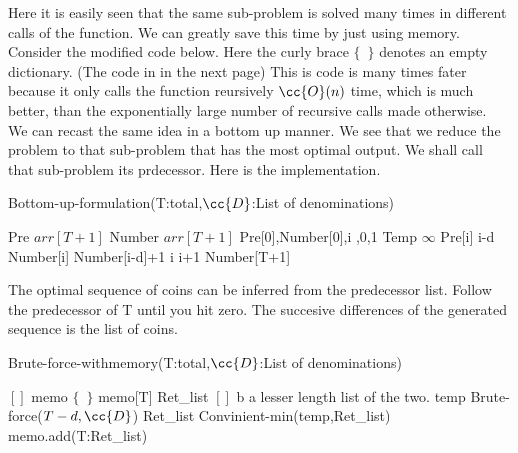 \documentclass{myclass}
\begin{document}
Here it is easily seen that the same sub-problem is solved many times in different 
calls of the function. We can greatly save this time by just using memory. Consider the modified code below.
Here the curly brace $\{\,\,\,\}$ denotes an empty dictionary. (The code in in the next page)
This is code is many times fater because it only calls the function reursively $\cc{O}(n)$ time,
which is much better, than the exponentially large number of recursive calls made otherwise.
\\
We can recast the same idea in a bottom up manner. We see that we reduce the problem to that sub-problem that has the most optimal output.
We shall call that sub-problem its prdecessor. Here is the implementation.
\begin{algorithm}
    \caption*{Bottom-up-formulation(T:total,$\cc{D}$:List of denominations)}
    \begin{algorithmic}[1]
        \State Pre \ass $arr[T+1]$   
        \State Number \ass $arr[T+1]$   
        \State Pre[0],Number[0],i ,0,1
            \State Temp \ass $\infty$
                    \State Pre[i] \ass i-d 
                    \State Number[i] \ass Number[i-d]+1
                \EndIf
            \EndFor
        \State i \ass i+1
        \EndWhile
        \State {} Number[T+1]
    \end{algorithmic}
\end{algorithm}

The optimal sequence of coins can be inferred from the predecessor list. Follow the predecessor of T until you hit zero. The
succesive differences of the generated sequence is the list of coins.

\newpage
\begin{algorithm}
    \caption*{Brute-force-withmemory(T:total,$\cc{D}$:List of denominations)}
    \begin{algorithmic}[1]
            \State {} $[]$
        \EndIf
        \State memo \ass $\{\,\,\,\}$   
            \State {} memo[T]
        \EndIf
        \State Ret\_list \ass $[]$
                \State {} b
                \State {} a
            \Else 
                \State {} lesser length list of the two.
            \EndIf
        \EndProcedure
            \State temp \ass Brute-force($T-d,\cc{D}$)
            \State Ret\_list \ass Convinient-min(temp,Ret\_list)
        \EndFor
        \State memo.add(T:Ret\_list)
    \end{algorithmic}
\end{algorithm}
\end{document}
